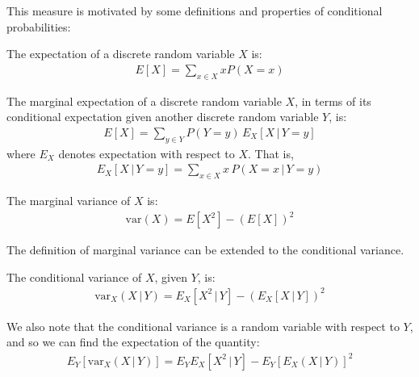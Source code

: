 \documentclass[12pt, twoside, a4paper]{report}
\def\var{\text{var}}
\begin{document}
This measure is motivated by some definitions and properties of conditional probabilities:\\

\begin{mydef}[Expectation]
\label{mrmmc:def:ex}
The expectation of a discrete random variable $X$ is:
\begin{align*}
E[X] = \sum_{x \in X} x P(X=x)
\end{align*}
\end{mydef}

\begin{mydef}
\label{mrmmc:def:margex}
The marginal expectation of a discrete random variable $X$, in terms of its conditional expectation given another discrete random variable $Y$, is:
\begin{align*}
E[X] = \sum_{y \in Y} P(Y=y) \, E_X[X \, | \, Y=y]
\end{align*}
where $E_X$ denotes expectation with respect to $X$. That is,
\begin{align*}
E_X[X \, | \,Y=y] = \sum_{x\in X} x \, P(X=x \, | \, Y=y)
\end{align*}
\end{mydef}

\begin{mydef}
\label{mrmmc:def:margvar}
The marginal variance of $X$ is:
\begin{align*}
\var(X) = E[X^2] - \left( E[X] \right) ^2
\end{align*}
\end{mydef}

The definition of marginal variance can be extended to the conditional variance.\\

\begin{mydef}
The conditional variance of $X$, given $Y$, is:
\begin{align*}
\var_X(X \, | \, Y) = E_X[X^2 \, | \, Y] - \left( E_X[X \, | \, Y] \right)^2
\end{align*}
\end{mydef}

We also note that the conditional variance is a random variable with respect to $Y$, and so we can find the expectation of the quantity:
\begin{align}
E_Y [ \var_X(X \, | \, Y) ] = E_YE_X[X^2 \, | \, Y] - E_Y [ E_X(X\,|\,Y) ] ^2 \label{mrmmc:eq:star}
\end{align}
\end{document}
